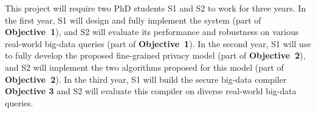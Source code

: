 This project will require two PhD students S1 and S2 to work for 
three years. In the first year, S1 will design and fully implement the \kakute 
system (part of \textbf{Objective~1}), and S2 will evaluate its performance 
and robustness on various real-world big-data queries (part of 
\textbf{Objective~1}). In the second year, S1 will 
use \kakute to fully develop the proposed fine-grained privacy model (part of 
\textbf{Objective~2}), and S2 will implement the two algorithms proposed for 
this model (part of \textbf{Objective~2}). In the third year, S1 will build the 
secure big-data compiler \textbf{Objective 3} and S2 will evaluate this 
compiler on diverse real-world big-data queries.


